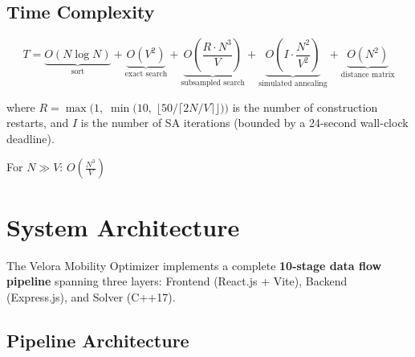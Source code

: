 \documentclass[11pt,a4paper]{article}
\begin{document}
\subsection{Time Complexity}

\[
T = \underbrace{O(N \log N)}_{\text{sort}}
  + \underbrace{O(V^2)}_{\text{exact search}}
  + \underbrace{O\!\left(\frac{R \cdot N^3}{V}\right)}_{\text{subsampled search}}
  + \underbrace{O\!\left(I \cdot \frac{N^2}{V^2}\right)}_{\text{simulated annealing}}
  + \underbrace{O(N^2)}_{\text{distance matrix}}
\]

\noindent where $R = \max\!\bigl(1,\;\min\!\bigl(10,\;\lfloor 50 / \lceil 2N/V \rceil\rfloor\bigr)\bigr)$ is the number of construction restarts, and $I$ is the number of SA iterations (bounded by a 24-second wall-clock deadline).

\begin{resultbox}
For $N \gg V$:\quad
$\displaystyle\boxed{O\!\left(\frac{N^3}{V}\right)}$
\end{resultbox}

\newpage
\section{System Architecture}
\label{sec:architecture}

The Velora Mobility Optimizer implements a complete \textbf{10-stage data flow pipeline} spanning three layers: Frontend (React.js + Vite), Backend (Express.js), and Solver (C++17).

\subsection{Pipeline Architecture}
\end{document}
